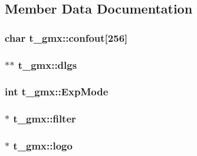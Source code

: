 \subsection{\-Member \-Data \-Documentation}
\hypertarget{structt__gmx_aa0a7654727c66793a81d7038faa8c7b6}{
\subsubsection[{confout}]{\setlength{\rightskip}{0pt plus 5cm}char {\bf t\-\_\-gmx\-::confout}\mbox{[}256\mbox{]}}}\label{structt__gmx_aa0a7654727c66793a81d7038faa8c7b6}
\hypertarget{structt__gmx_ad77837849b5d231ff8eb2d9eaa0d78c1}{
\subsubsection[{dlgs}]{$\ast$$\ast$ {\bf t\-\_\-gmx\-::dlgs}}}\label{structt__gmx_ad77837849b5d231ff8eb2d9eaa0d78c1}
\hypertarget{structt__gmx_a05400aa5fd890e83f8999fc56701d1de}{
\subsubsection[{\-Exp\-Mode}]{\setlength{\rightskip}{0pt plus 5cm}int {\bf t\-\_\-gmx\-::\-Exp\-Mode}}}\label{structt__gmx_a05400aa5fd890e83f8999fc56701d1de}
\hypertarget{structt__gmx_a050043e4c1971cac327ab6752242badb}{
\subsubsection[{filter}]{$\ast$ {\bf t\-\_\-gmx\-::filter}}}\label{structt__gmx_a050043e4c1971cac327ab6752242badb}
\hypertarget{structt__gmx_a03c1e3bcc269b8122c5da050a26e6812}{
\subsubsection[{logo}]{$\ast$ {\bf t\-\_\-gmx\-::logo}}}\label{structt__gmx_a03c1e3bcc269b8122c5da050a26e6812}
